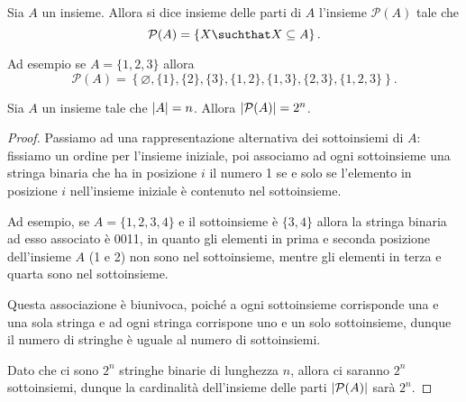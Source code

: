 \begin{definition}
    Sia $A$ un insieme. Allora si dice insieme delle parti di $A$ l'insieme $\mathcal{P}(A)$ tale che \[
        \mathcal{P}(A) = \left\{ X \suchthat X \subseteq A\right\}    
    .\]
\end{definition}

Ad esempio se $A = \{1, 2, 3\}$ allora \[
    \mathcal{P}(A) = \left\{ \varnothing, \{1\}, \{2\}, \{3\}, \{1, 2\}, \{1, 3\}, \{2, 3\}, \{1, 2, 3\} \right\}.
\]

\begin{proposition}
    Sia $A$ un insieme tale che $\left|A\right| = n$. Allora $\left|\mathcal{P}(A)\right| = 2^n$.
\end{proposition}
\begin{proof}
    Passiamo ad una rappresentazione alternativa dei sottoinsiemi di $A$: fissiamo un ordine per l'insieme iniziale, poi associamo ad ogni sottoinsieme una stringa binaria che ha in posizione $i$ il numero 1 se e solo se l'elemento in posizione $i$ nell'insieme iniziale è contenuto nel sottoinsieme.

    Ad esempio, se $A = \{1, 2, 3, 4\}$ e il sottoinsieme è $\{3, 4\}$ allora la stringa binaria ad esso associato è 0011, in quanto gli elementi in prima e seconda posizione dell'insieme $A$ (1 e 2) non sono nel sottoinsieme, mentre gli elementi in terza e quarta sono nel sottoinsieme. 

    Questa associazione è biunivoca, poiché a ogni sottoinsieme corrisponde una e una sola stringa e ad ogni stringa corrispone uno e un solo sottoinsieme, dunque il numero di stringhe è uguale al numero di sottoinsiemi.

    Dato che ci sono $2^n$ stringhe binarie di lunghezza $n$, allora ci saranno $2^n$ sottoinsiemi, dunque la cardinalità dell'insieme delle parti $\left|\mathcal{P}(A)\right|$ sarà $2^n$.
\end{proof}

